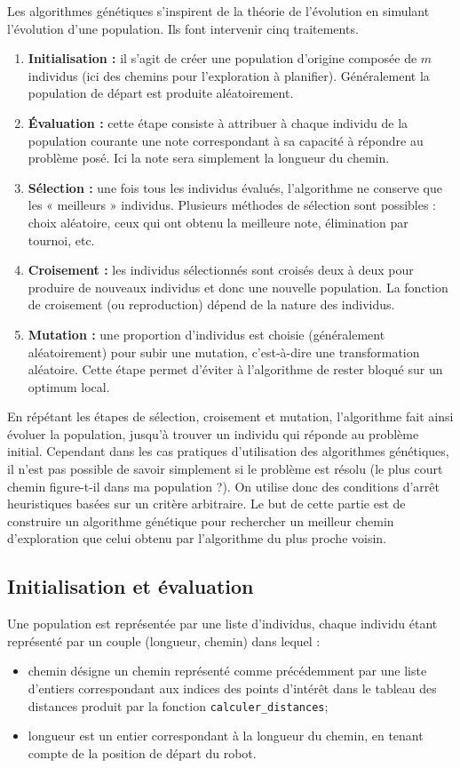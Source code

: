 Les algorithmes génétiques s’inspirent de la théorie de l’évolution en simulant l’évolution d’une population. Ils
font intervenir cinq traitements.
\begin{enumerate}
\item \textbf{Initialisation :} il s’agit de créer une population d’origine composée de $m$ individus (ici des chemins pour l’exploration à
planifier). Généralement la population de départ est produite aléatoirement.
\item \textbf{Évaluation :} cette étape consiste à attribuer à chaque individu de la population courante une note correspondant à sa
capacité à répondre au problème posé. Ici la note sera simplement la longueur du chemin.
\item \textbf{Sélection :} une fois tous les individus évalués, l’algorithme ne conserve que les « meilleurs » individus. Plusieurs méthodes
de sélection sont possibles : choix aléatoire, ceux qui ont obtenu la meilleure note, élimination par
tournoi, etc.
\item \textbf{Croisement :} les individus sélectionnés sont croisés deux à deux pour produire de nouveaux individus et donc une nouvelle
population. La fonction de croisement (ou reproduction) dépend de la nature des individus.
\item \textbf{Mutation :} une proportion d’individus est choisie (généralement aléatoirement) pour subir une mutation, c’est-à-dire
une transformation aléatoire. Cette étape permet d’éviter à l’algorithme de rester bloqué sur un optimum
local.
\end{enumerate}
En répétant les étapes de sélection, croisement et mutation, l’algorithme fait ainsi évoluer la population, jusqu’à
trouver un individu qui réponde au problème initial. Cependant dans les cas pratiques d’utilisation des
algorithmes génétiques, il n’est pas possible de savoir simplement si le problème est résolu (le plus court chemin
figure-t-il dans ma population ?). On utilise donc des conditions d’arrêt heuristiques basées sur un critère
arbitraire.
Le but de cette partie est de construire un algorithme génétique pour rechercher un meilleur chemin d’exploration
que celui obtenu par l’algorithme du plus proche voisin.


\subsection{Initialisation et évaluation}
Une population est représentée par une liste d’individus, chaque individu étant représenté par un couple (longueur,
chemin) dans lequel :
\begin{itemize}
\item chemin désigne un chemin représenté comme précédemment par une liste d’entiers correspondant aux indices
des points d’intérêt dans le tableau des distances produit par la fonction \texttt{calculer\_distances};
\item longueur est un entier correspondant à la longueur du chemin, en tenant compte de la position de départ du
robot.
\end{itemize}

